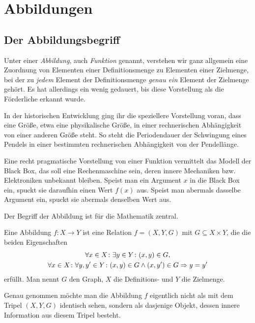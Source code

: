 \newpage
\section{Abbildungen}

\subsection{Der Abbildungsbegriff}

Unter einer \emph{Abbildung}, auch \emph{Funktion}%
 genannt, verstehen wir ganz allgemein eine Zuordnung von
Elementen einer Definitionsmenge zu Elementen einer Zielmenge, bei der
zu \emph{jedem} Element der Definitionsmenge \emph{genau ein} Element
der Zielmenge gehört. Es hat allerdings ein wenig gedauert, bis
diese Vorstellung als die Förderliche erkannt wurde.

In der historischen Entwicklung ging ihr die speziellere Vorstellung
voran, dass eine Größe, etwa eine physikalische Größe, in einer
rechnerischen Abhängigkeit von einer anderen Größe steht. So steht
die Periodendauer der Schwingung eines Pendels in einer bestimmten
rechnerischen Abhängigkeit von der Pendellänge.

Eine recht pragmatische Vorstellung von einer Funktion vermittelt das Modell
der Black Box, das soll eine Rechenmaschine sein, deren innere Mechaniken
bzw. Elektroniken unbekannt bleiben. Speist man ein Argument $x$ in die
Black Box ein, spuckt sie daraufhin einen Wert $f(x)$ aus. Speist man
abermals dasselbe Argument ein, spuckt sie abermals denselben Wert aus.

Der Begriff der Abbildung ist für die Mathematik zentral.

\begin{Definition}[Abbildung]\newlinefirst
Eine Abbildung $f\colon X\to Y$ ist eine Relation $f=(X,Y,G)$ mit
$G\subseteq X\times Y$, die die beiden Eigenschaften
\begin{gather*}
\forall x\in X\colon\exists y\in Y\colon (x,y)\in G,\\
\forall x\in X\colon\forall y,y'\in Y\colon (x,y)\in G\land (x,y')\in G\Rightarrow y=y'
\end{gather*}
erfüllt. Man nennt $G$ den Graph, $X$ die Definitions- und
$Y$ die Zielmenge.
\end{Definition}
Genau genommen möchte man die Abbildung $f$ eigentlich nicht als mit
dem Tripel $(X,Y,G)$ identisch sehen, sondern als dasjenige Objekt,
dessen innere Information aus diesem Tripel besteht.

